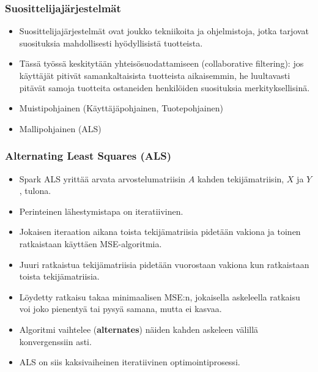 \documentclass{beamer}
\begin{document}
\begin{frame}
\frametitle{Suosittelijajärjestelmät}

\begin{itemize}
	\item Suosittelijajärjestelmät ovat joukko tekniikoita ja ohjelmistoja, jotka tarjovat suosituksia mahdollisesti hyödyllisistä tuotteista.
	\item Tässä työssä keskitytään yhteisösuodattamiseen (collaborative filtering): jos käyttäjät pitivät samankaltaisista tuotteista aikaisemmin, he luultavasti pitävät samoja tuotteita ostaneiden henkilöiden suosituksia merkityksellisinä.
	\item Muistipohjainen (Käyttäjäpohjainen, Tuotepohjainen)
	\item Mallipohjainen (ALS)
\end{itemize}

\end{frame}


\begin{frame}
\frametitle{Alternating Least Squares (ALS)}

\begin{itemize}
	\item Spark ALS yrittää arvata arvostelumatriisin $A$ kahden tekijämatriisin, $X$ ja $Y$, tulona.
	\item Perinteinen lähestymistapa on iteratiivinen.
	\item Jokaisen iteraation aikana toista tekijämatriisia pidetään vakiona ja toinen ratkaistaan käyttäen MSE-algoritmia.
	\item Juuri ratkaistua tekijämatriisia pidetään vuorostaan vakiona kun ratkaistaan toista tekijämatriisia.
	\item Löydetty ratkaisu takaa minimaalisen MSE:n, jokaisella askeleella ratkaisu voi joko pienentyä tai pysyä samana, mutta ei kasvaa.
	\item Algoritmi vaihtelee (\textbf{alternates}) näiden kahden askeleen välillä konvergenssiin asti.
	\item ALS on siis kaksivaiheinen iteratiivinen optimointiprosessi.
\end{itemize}

\end{frame}

\end{document}
